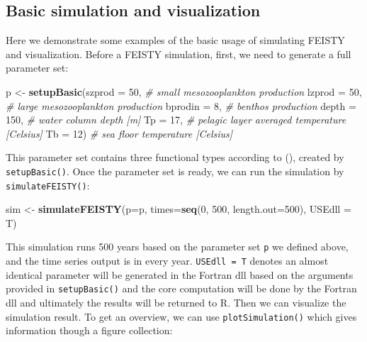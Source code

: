 \documentclass[
]{article}
\newenvironment{Shaded}{\begin{snugshade}}{\end{snugshade}}
\newcommand{\AttributeTok}[1]{\textcolor[rgb]{0.13,0.29,0.53}{#1}}
\newcommand{\CommentTok}[1]{\textcolor[rgb]{0.56,0.35,0.01}{\textit{#1}}}
\newcommand{\DecValTok}[1]{\textcolor[rgb]{0.00,0.00,0.81}{#1}}
\newcommand{\FunctionTok}[1]{\textcolor[rgb]{0.13,0.29,0.53}{\textbf{#1}}}
\newcommand{\NormalTok}[1]{#1}
\newcommand{\OtherTok}[1]{\textcolor[rgb]{0.56,0.35,0.01}{#1}}
\begin{document}
\subsection{Basic simulation and
visualization}\label{basic-simulation-and-visualization}

Here we demonstrate some examples of the basic usage of simulating
FEISTY and visualization. Before a FEISTY simulation, first, we need to
generate a full parameter set:

\begin{Shaded}
\begin{Highlighting}[]
\NormalTok{p }\OtherTok{\textless{}{-}} \FunctionTok{setupBasic}\NormalTok{(}\AttributeTok{szprod =} \DecValTok{50}\NormalTok{,   }\CommentTok{\# small mesozooplankton production}
                \AttributeTok{lzprod =} \DecValTok{50}\NormalTok{,   }\CommentTok{\# large mesozooplankton production}
                \AttributeTok{bprodin  =} \DecValTok{8}\NormalTok{,  }\CommentTok{\# benthos production}
                \AttributeTok{depth  =} \DecValTok{150}\NormalTok{,  }\CommentTok{\# water column depth [m]}
                \AttributeTok{Tp     =} \DecValTok{17}\NormalTok{,   }\CommentTok{\# pelagic layer averaged temperature [Celsius]}
                \AttributeTok{Tb     =} \DecValTok{12}\NormalTok{)   }\CommentTok{\# sea floor temperature [Celsius]}
\end{Highlighting}
\end{Shaded}

This parameter set contains three functional types according to
(), created by
\texttt{setupBasic()}. Once the parameter set is ready, we can run the
simulation by \texttt{simulateFEISTY()}:

\begin{Shaded}
\begin{Highlighting}[]
\NormalTok{sim }\OtherTok{\textless{}{-}} \FunctionTok{simulateFEISTY}\NormalTok{(}\AttributeTok{p=}\NormalTok{p,  }\AttributeTok{times=}\FunctionTok{seq}\NormalTok{(}\DecValTok{0}\NormalTok{, }\DecValTok{500}\NormalTok{, }\AttributeTok{length.out=}\DecValTok{500}\NormalTok{), }\AttributeTok{USEdll =}\NormalTok{ T)}
\end{Highlighting}
\end{Shaded}

This simulation runs 500 years based on the parameter set \texttt{p} we
defined above, and the time series output is in every year.
\texttt{USEdll\ =\ T} denotes an almost identical parameter will be
generated in the Fortran dll based on the arguments provided in
\texttt{setupBasic()} and the core computation will be done by the
Fortran dll and ultimately the results will be returned to R. Then we
can visualize the simulation result. To get an overview, we can use
\texttt{plotSimulation()} which gives information though a figure
collection:
\end{document}
